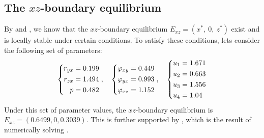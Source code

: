 \subsection{The $xz$-boundary equilibrium}\label{subsec:numsim_xz_boundary_equilibrium}
By  and , we know that the $xz$-boundary equilibrium $E_{xz}=\left(x^*,\ 0,\ z^*\right)$ exist and is locally stable under certain conditions.
To satisfy these conditions, lets consider the following set of parameters:
\begin{equation}\label{params:boundary-xz}
    \begin{dcases}
        \begin{aligned}
            r_{yx} &= 0.199\\
            r_{zx} &= 1.494\\
            p &= 0.482
        \end{aligned}
    \end{dcases},\quad 
    \begin{dcases}
        \begin{aligned}
            \varphi_{xy} &= 0.449\\
            \varphi_{yx} &= 0.993\\
            \varphi_{xz} &= 1.152
        \end{aligned}
    \end{dcases},\quad
    \begin{dcases}
        \begin{aligned}
            u_1 &= 1.671\\
            u_2 &= 0.663\\
            u_3 &= 1.556\\
            u_4 &= 1.04
        \end{aligned}
    \end{dcases}
\end{equation}
Under this set of parameter values, the $xz$-boundary equilibrium is $E_{xz}=(0.6499,0,0.3039)$.
This is further supported by , which is the result of numerically solving .
